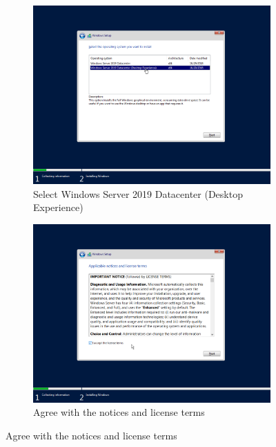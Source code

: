 \begin{figure}[!htb]\ContinuedFloat
	\begin{subfigure}{0.5\textwidth}
		\captionsetup{width=0.8\linewidth}
		\includegraphics[width=0.9\linewidth]{img/Methodologie/Migration6.png}
		\centering
		\caption{Select Windows Server 2019 Datacenter (Desktop Experience)}
	\end{subfigure}
	\begin{subfigure}{0.5\textwidth}
		\captionsetup{width=0.8\linewidth}
		\includegraphics[width=0.9\linewidth]{img/Methodologie/Migration7.png} 
		\centering
		\caption{Agree with the notices and license terms}
	\end{subfigure}
\end{figure}

